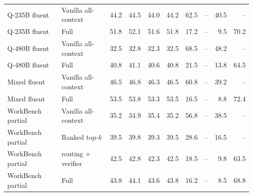 \begin{longtable}{llrrrrrrrr}
Q-235B fluent & Vanilla all-context & 44.2 & 44.5 & 44.0 & 44.2 & 62.5 & -- & 40.5 & -- \\
Q-235B fluent & \method{} Full & 51.8 & 52.1 & 51.6 & 51.8 & 17.2 & -- & 9.5 & 70.2 \\
Q-480B fluent & Vanilla all-context & 32.5 & 32.8 & 32.3 & 32.5 & 68.5 & -- & 48.2 & -- \\
Q-480B fluent & \method{} Full & 40.8 & 41.1 & 40.6 & 40.8 & 21.5 & -- & 13.8 & 64.5 \\
Mixed fluent & Vanilla all-context & 46.5 & 46.8 & 46.3 & 46.5 & 60.8 & -- & 39.2 & -- \\
Mixed fluent & \method{} Full & 53.5 & 53.8 & 53.3 & 53.5 & 16.5 & -- & 8.8 & 72.4 \\
WorkBench partial & Vanilla all-context & 35.2 & 34.9 & 35.4 & 35.2 & 56.8 & -- & 38.5 & -- \\
WorkBench partial & Ranked top-$k$ & 39.5 & 39.8 & 39.3 & 39.5 & 28.6 & -- & 16.5 & -- \\
WorkBench partial & \method{} routing + verifier & 42.5 & 42.8 & 42.3 & 42.5 & 18.5 & -- & 9.8 & 63.5 \\
\rowcolor{tracesoft}
WorkBench partial & \method{} Full & 43.8 & 44.1 & 43.6 & 43.8 & 16.2 & -- & 8.5 & 68.8 \\
\end{longtable}
\endgroup
